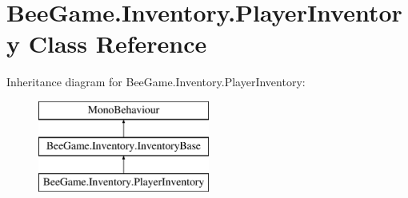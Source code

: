 \hypertarget{class_bee_game_1_1_inventory_1_1_player_inventory}{}\section{Bee\+Game.\+Inventory.\+Player\+Inventory Class Reference}
\label{class_bee_game_1_1_inventory_1_1_player_inventory}
Inheritance diagram for Bee\+Game.\+Inventory.\+Player\+Inventory\+:\begin{figure}[H]
\begin{center}
\leavevmode
\includegraphics[height=3.000000cm]{class_bee_game_1_1_inventory_1_1_player_inventory}
\end{center}
\end{figure}
